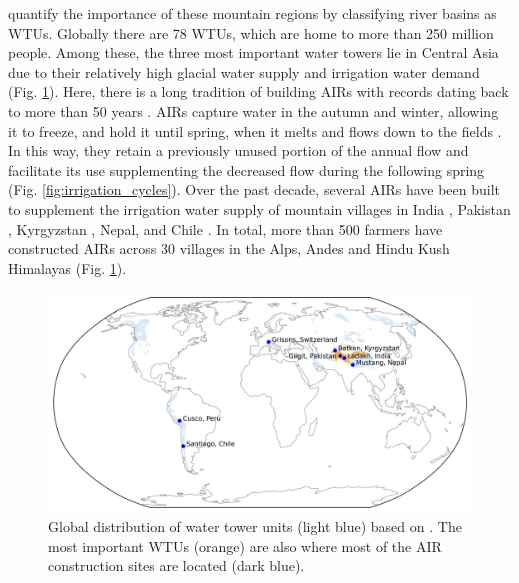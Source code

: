 \citet{immerzeelImportanceVulnerabilityWorld2020} quantify the importance of these mountain regions by
classifying river basins as \ac{WTUs}. Globally there are 78 \ac{WTUs}, which are home to more than 250 million
people. Among these, the three most important water towers lie in Central Asia due to their relatively high
glacial water supply and irrigation water demand (Fig. \ref{fig:WTUs_AIRs}).  Here, there is a long tradition of
building \ac{AIRs} with records dating back to more than 50 years
\citep{nusserSociohydrologyArtificialGlaciers2019}. \ac{AIRs} capture water in the autumn and winter, allowing
it to freeze, and hold it until spring, when it melts and flows down to the fields
\citep{ipccChapterHighMountain2019, vinceGlacierMan2009, clouseLadakhArtificialGlaciers2017,
nusserSociohydrologyArtificialGlaciers2019}. In this way, they retain a previously unused portion of the annual
flow and facilitate its use supplementing the decreased flow during the following spring (Fig.
\ref{fig:irrigation_cycles}). Over the past decade, several \ac{AIRs} have been built to supplement the
irrigation water supply of mountain villages in India \citep{wangchukIceStupaCompetition2020,
palmerStoringFrozenWater2022, aggarwalAdaptationClimateChange2021}, Pakistan
\citep{awazproductionIceStupaArtificial2022}, Kyrgyzstan \citep{bbcnewsBrightArtificialGlacier2020}, Nepal, and
Chile \citep{reutersConservationistsChileAim2021}. In total, more than 500 farmers have constructed AIRs across
30 villages in the Alps, Andes and Hindu Kush Himalayas (Fig. \ref{fig:WTUs_AIRs}). 

\begin{figure}[htb]
\centering
\includegraphics[width=\textwidth]{figs/WTUs_AIRs.jpg}

\caption{ Global distribution of water tower units (light blue) based on
\cite{immerzeelImportanceVulnerabilityWorld2020}. The most important \ac{WTUs} (orange) are also where most of
the AIR construction sites  are located (dark blue). } 

\label{fig:WTUs_AIRs} 
\end{figure}

